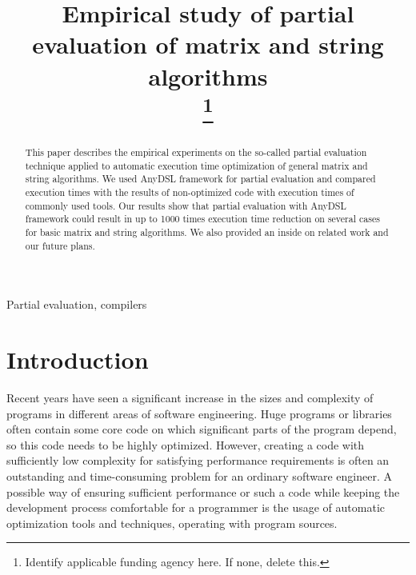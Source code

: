 \documentclass[conference]{IEEEtran}
\begin{document}
\linenumbers
\title{Empirical study of partial evaluation of matrix and string algorithms\\

\thanks{Identify applicable funding agency here. If none, delete this.}
}

\author{
\and
{}
\and
{}
}
\maketitle

\begin{abstract}
	
This paper describes the empirical experiments on the so-called partial evaluation technique applied to automatic execution time optimization of general matrix and string algorithms. We used AnyDSL framework for partial evaluation and compared execution times with the results of non-optimized code with execution times of commonly used tools. Our results show that partial evaluation with AnyDSL framework could result in up to 1000 times execution time reduction on several cases for basic matrix and string algorithms. We also provided an inside on related work and our future plans.
	
\end{abstract}

\begin{IEEEkeywords}
Partial evaluation, compilers
\end{IEEEkeywords}

\section{Introduction}
Recent years have seen a significant increase in the sizes and complexity of programs in different areas of software engineering. Huge programs or libraries often contain some core code on which significant parts of the program depend, so this code needs to be highly optimized. However, creating a code with sufficiently low complexity for satisfying performance requirements is often an outstanding and time-consuming problem for an ordinary software engineer. A possible way of ensuring sufficient performance or such a code while keeping the development process comfortable for a programmer is the usage of automatic optimization tools and techniques, operating with program sources.
\end{document}

